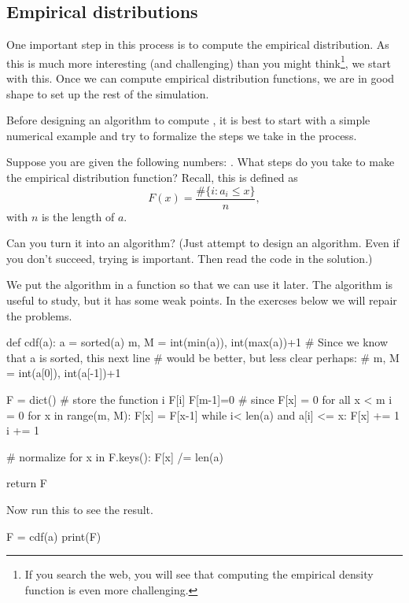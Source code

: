 \documentclass{scrartcl}
\begin{document}
\subsection{Empirical distributions}
\label{sec:empir-distr}

One important step in this process is to compute the empirical distribution. As this is much more interesting (and challenging) than you might think\footnote{If you search the web, you will see that computing the empirical density function is even more challenging.}, we start with this. Once we can compute empirical distribution functions, we are in good shape to set up the rest of the simulation. 

Before designing an algorithm to compute , it is best to start with a simple numerical example and try to formalize the steps we take in the process.

\begin{exercise}
  Suppose you are given the following numbers: . What steps do you take to make the empirical distribution function? Recall, this is defined as
  \begin{equation}
    \label{eq:1}
    F(x) = \frac{\# \{i : a_i \leq x\}}{n}, 
  \end{equation}
  with $n$ is the length of $a$.

Can you turn it into an algorithm? (Just attempt to design an algorithm. Even if you don't succeed, trying is important. Then read the code in the solution.)

  \begin{solution}
We put the algorithm in a function so that we can use it later.  The algorithm is useful to study,  but it has some weak points. In the exercses below we will repair the problems. 
    \begin{pyblock}
def cdf(a):
    a = sorted(a)
    m, M = int(min(a)), int(max(a))+1
    # Since we know that a is sorted, this next line 
    # would be better, but less clear perhaps: 
    # m, M = int(a[0]), int(a[-1])+1 

    F = dict() # store the function i \to F[i]
    F[m-1]=0  # since F[x] = 0 for all x < m
    i = 0
    for x in range(m, M):
        F[x] = F[x-1]
        while i< len(a) and a[i] <= x:
            F[x] += 1
            i += 1

    # normalize
    for x in F.keys(): 
        F[x] /= len(a)

    return F
    \end{pyblock}

Now run  this to see the result.
\begin{pyblock}
F = cdf(a)
print(F)
\end{pyblock}


  \end{solution}
\end{exercise}
\end{document}
